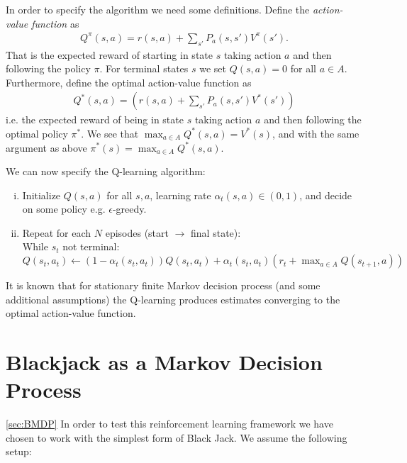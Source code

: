 In order to specify the algorithm we need some definitions. Define the \textit{action-value function} as
\begin{align*}
	Q^{\pi} ( s,a  ) = r(s,a) + \sum_{s'} P_{a}(s,s')V^{\pi}(s').
\end{align*}
That is the expected reward of starting in state $s$ taking action $a$ and then following the policy $\pi$. For terminal states $s$ we set $Q(s,a)=0$ for all $a\in A$. Furthermore, define the optimal action-value function as
\begin{align*}
Q^*  ( s,a  ) =  (r(s,a) + \sum_{s'} P_{a}(s,s')V^{* }(s'))
\end{align*}
i.e. the expected reward of being in state $s$ taking action $a$ and then following the optimal policy $\pi^*$. We see that $\max_{a \in A} Q^*(s,a) = V^*(s)$, and 
with the same argument as above $\pi^*(s) = \max_{a \in A}Q^*(s,a)$. 

We can now specify the Q-learning algorithm:

\begin{enumerate}[(i)]
	\item Initialize $Q(s,a)$ for all $s,a$, learning rate $\alpha_t(s,a) \in (0,1)$, and decide on some policy e.g. $\epsilon$-greedy.
	\item Repeat for each $N$ episodes (start $\to$ final state): \\
	While $s_t$ not terminal:  $Q(s_t,a_t)  \leftarrow (1-\alpha_t(s_t,a_t))Q(s_t,a_t) + \alpha_t(s_t,a_t)( r_t + \max_{a \in A} Q(s_{t+1},a) )$
\end{enumerate}
It is known that for stationary finite Markov decision process (and some additional assumptions) the Q-learning produces estimates converging to the optimal action-value function.


\section*{Blackjack as a Markov Decision Process}\ref{sec:BMDP}
In order to test this reinforcement learning framework we have chosen to work with the simplest form of Black Jack. We assume the following setup:


